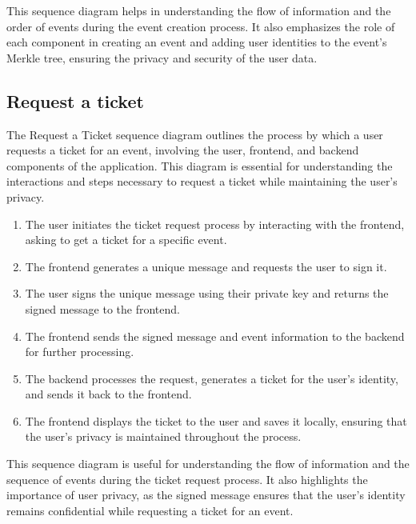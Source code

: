 This sequence diagram helps in understanding the flow of information and the order of events during the event creation process. It also emphasizes the role of each component in creating an event and adding user identities to the event's Merkle tree, ensuring the privacy and security of the user data.

\subsection{Request a ticket}
The Request a Ticket sequence diagram outlines the process by which a user requests a ticket for an event, involving the user, frontend, and backend components of the application. This diagram is essential for understanding the interactions and steps necessary to request a ticket while maintaining the user's privacy.

\begin{enumerate}
  \item The user initiates the ticket request process by interacting with the frontend, asking to get a ticket for a specific event.
  \item The frontend generates a unique message and requests the user to sign it.
  \item The user signs the unique message using their private key and returns the signed message to the frontend.
  \item The frontend sends the signed message and event information to the backend for further processing.
  \item The backend processes the request, generates a ticket for the user's identity, and sends it back to the frontend.
  \item The frontend displays the ticket to the user and saves it locally, ensuring that the user's privacy is maintained throughout the process.
\end{enumerate}

This sequence diagram is useful for understanding the flow of information and the sequence of events during the ticket request process. It also highlights the importance of user privacy, as the signed message ensures that the user's identity remains confidential while requesting a ticket for an event.

